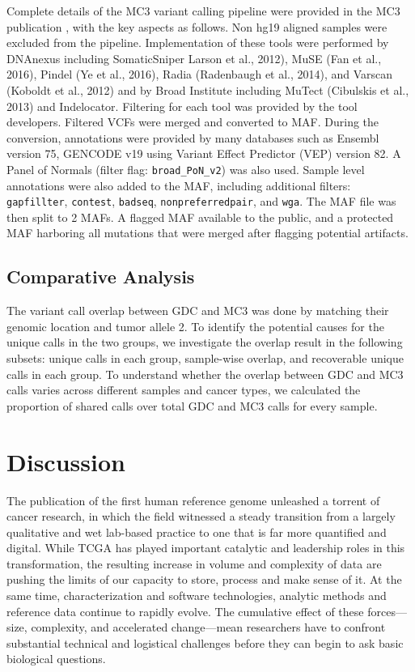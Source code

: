 Complete details of the MC3 variant calling pipeline were provided in the MC3 publication \cite{ellrottk_tcga:MC3MutationCalling2018}, with the key aspects as follows. Non hg19 aligned samples were excluded from the pipeline. Implementation of these tools were performed by DNAnexus including SomaticSniper Larson et al., 2012), MuSE (Fan et al., 2016), Pindel (Ye et al., 2016), Radia (Radenbaugh et al., 2014), and Varscan (Koboldt et al., 2012) and by Broad Institute including MuTect (Cibulskis et al., 2013) and Indelocator. Filtering for each tool was provided by the tool developers. Filtered VCFs were merged and converted to MAF. During the conversion, annotations were provided by many databases such as Ensembl version 75, GENCODE v19 using Variant Effect Predictor (VEP) version 82. A Panel of Normals (filter flag: \texttt{broad\_PoN\_v2}) was also used. Sample level annotations were also added to the MAF, including additional filters: \texttt{gapfillter}, \texttt{contest}, \texttt{badseq}, \texttt{nonpreferredpair}, and \texttt{wga}. The MAF file was then split to 2 MAFs. A flagged MAF available to the public, and a protected MAF harboring all mutations that were merged after flagging potential artifacts.

\subsection{Comparative Analysis}
The variant call overlap between GDC and MC3 was done by matching their genomic location and tumor allele 2. To identify the potential causes for the unique calls in the two groups, we investigate the overlap result in the following subsets: unique calls in each group, sample-wise overlap, and recoverable unique calls in each group. To understand whether the overlap between GDC and MC3 calls varies across different samples and cancer types, we calculated the proportion of shared calls over total GDC and MC3 calls for every sample.


\section{Discussion}
The publication of the first human reference genome unleashed a torrent of cancer research, in which the field witnessed a steady transition from a largely qualitative and wet lab-based practice to one that is far more quantified and digital. While TCGA has played important catalytic and leadership roles in this transformation, the resulting increase in volume and complexity of data are pushing the limits of our capacity to store, process and make sense of it. At the same time, characterization and software technologies, analytic methods and reference data continue to rapidly evolve. The cumulative effect of these forces---size, complexity, and accelerated change---mean researchers have to confront substantial technical and logistical challenges before they can begin to ask basic biological questions.

